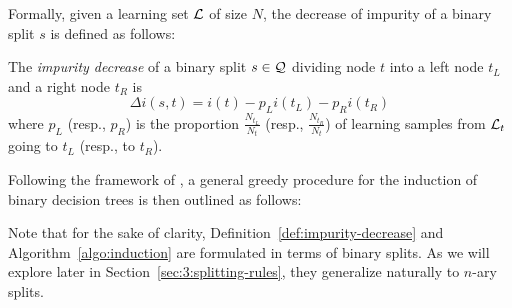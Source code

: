 Formally, given a learning set ${\cal L}$ of size $N$, the decrease of impurity
of a binary split $s$ is defined as follows:

\begin{definition}\label{def:impurity-decrease}
The \emph{impurity decrease} of a binary split $s \in {\cal Q}$ dividing node $t$ into
a left node $t_L$ and a right node $t_R$ is
\begin{equation}
\Delta i(s, t) = i(t) - p_L i(t_L) - p_R i(t_R)
\end{equation}
where $p_L$ (resp., $p_R$) is the proportion $\tfrac{N_{t_L}}{N_t}$ (resp., $\tfrac{N_{t_R}}{N_t}$)
of learning samples from ${\cal L}_t$ going to $t_L$ (resp., to $t_R$).
\end{definition}

Following the framework of \citet{breiman:1984}, a general greedy procedure for
the induction of binary decision trees is then outlined as follows:


Note that for the sake of clarity, Definition~\ref{def:impurity-decrease} and
Algorithm~\ref{algo:induction} are formulated in terms of binary splits. As
we will explore later in Section~\ref{sec:3:splitting-rules},
they generalize naturally to $n$-ary splits.


